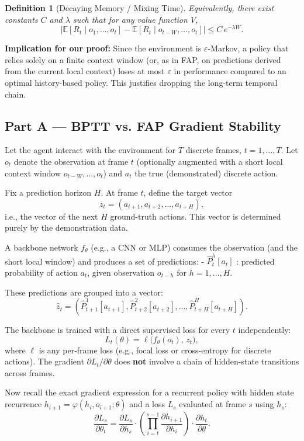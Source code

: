 \documentclass[11pt]{article}
\newtheorem{definition}{Definition}
\begin{document}
\begin{definition}[Decaying Memory / Mixing Time]
Equivalently, there exist constants \(C\) and \(\lambda\) such that for any value function \(V\),
\[
\left| \mathbb{E}[R_t \mid o_1, \dots, o_t] - \mathbb{E}[R_t \mid o_{t-W}, \dots, o_t] \right| \le C \, e^{-\lambda W}.
\]
\end{definition}

\textbf{Implication for our proof:} Since the environment is \(\varepsilon\)-Markov, a policy that relies solely on a finite context window (or, as in FAP, on predictions derived from the current local context) loses at most \(\varepsilon\) in performance compared to an optimal history-based policy. This justifies dropping the long-term temporal chain.

\subsection{Part A — BPTT vs. FAP Gradient Stability}

Let the agent interact with the environment for \(T\) discrete frames, \(t = 1, \dots, T\). Let \(o_t\) denote the observation at frame \(t\) (optionally augmented with a short local context window \(o_{t-W}, \dots, o_t\)) and \(a_t\) the true (demonstrated) discrete action.

Fix a prediction horizon \(H\). At frame \(t\), define the target vector
\[
z_t = (a_{t+1}, a_{t+2}, \dots, a_{t+H}), \tag{1}
\]
i.e., the vector of the next \(H\) ground-truth actions. This vector is determined purely by the demonstration data.

A backbone network \(f_\theta\) (e.g., a CNN or MLP) consumes the observation (and the short local window) and produces a set of predictions:
- \(\hat{P}^h_t[a_t]\) : predicted probability of action \(a_t\), given observation \(o_{t-h}\) for \(h = 1, \dots, H\).

These predictions are grouped into a vector:
\[
\hat{z}_t = (\hat{P}^1_{t+1}[a_{t+1}], \hat{P}^2_{t+2}[a_{t+2}], \dots, \hat{P}^H_{t+H}[a_{t+H}]). \tag{2}
\]

The backbone is trained with a direct supervised loss for every \(t\) independently:
\[
L_t(\theta) = \ell\bigl(f_\theta(o_t),\, z_t\bigr), \tag{3}
\]
where \(\ell\) is any per-frame loss (e.g., focal loss or cross-entropy for discrete actions). The gradient \(\partial L_t / \partial \theta\) does \textbf{not} involve a chain of hidden-state transitions across frames.

Now recall the exact gradient expression for a recurrent policy with hidden state recurrence \(h_{i+1} = \varphi(h_i, o_{i+1}; \theta)\) and a loss \(L_s\) evaluated at frame \(s\) using \(h_s\):
\[
\frac{\partial L_s}{\partial \theta_t}
=
\frac{\partial L_s}{\partial h_s}
\cdot
\left( \prod_{i=t}^{s-1} \frac{\partial h_{i+1}}{\partial h_i} \right)
\cdot
\frac{\partial h_t}{\partial \theta}. \tag{4}
\]
\end{document}

